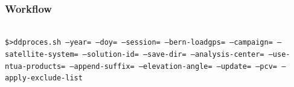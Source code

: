 \documentclass{beamer}
\begin{document}
\begin{frame}\frametitle{Workflow}\framesubtitle{}
\begin{columns}[T] %
\begin{column}{.48\textwidth}
  \texttt{\$>ddproces.sh --year= --doy= --session= --bern-loadgps= --campaign= --satellite-system= --solution-id= --save-dir= --analysis-center= --use-ntua-products= --append-suffix= --elevation-angle= --update= --pcv= --apply-exclude-list}
\end{column}
\hfill%
\begin{column}{.48\textwidth}
\end{column}
\end{columns}
\end{frame}
\end{document}
